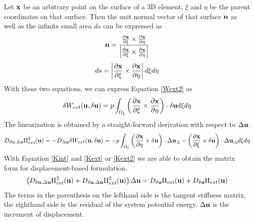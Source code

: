 Let $\bold{x}$ be an arbitrary point on the surface of a 3D element, $\xi$ and $\eta$ be the parent coordinates on that surface. Then the unit normal vector of that surface $\bold{n}$ as well as the infinite small area $ds$ can be expressed as
\begin{equation}
\bold{n} = \frac{  \frac{\partial{\bold{x}}}{\partial{\xi}} \times  \frac{\partial{\bold{x}}}{\partial{\eta}} }{\left| \frac{\partial{\bold{x}}}{\partial{\xi}} \times  \frac{\partial{\bold{x}}}{\partial{\eta}} \right|}
\end{equation}
\begin{equation}
ds = \left|\frac{\partial{\bold{x}}}{\partial{\xi}} \times  \frac{\partial{\bold{x}}}{\partial{\eta}}\right| d\xi{d\eta}
\end{equation}
With these two equations, we can express Equation \ref{Wext2} as
\begin{equation}
\delta{W_{ext}}(\bold{u}, \delta{\bold{u}}) = p\int_{\Omega_{\xi}}  \left(\frac{\partial{\bold{x}}}{\partial{\xi}} \times  \frac{\partial{\bold{x}}}{\partial{\eta}}\right) \cdot\delta{\bold{u}}d\xi{d\eta}
\end{equation}
The linearization is obtained by a straight-forward derivation with respect to $\Delta\bold{u}$. 
\begin{equation}  \label{Kext2}
D_{\delta\bold{u}, \Delta\bold{u}}\Pi_{ext}^2(\bold{u}) = - D_{\Delta{\bold{u}}}\delta{W_{ext}}(\bold{u}, \delta{\bold{u}}) = - p\int_{\Omega_{\xi}}  \left(\frac{\partial{\bold{x}}}{\partial{\eta}} \times \delta\bold{u}\right) \cdot\Delta{\bold{u}}_{,\xi} - 
\left(\frac{\partial{\bold{x}}}{\partial{\xi}} \times \delta\bold{u}\right) \cdot\Delta{\bold{u}}_{,\eta} d\xi{d\eta}
\end{equation}
With Equation \ref{Kint} and \ref{Kext} or \ref{Kext2} we are able to obtain the matrix form for displacement-based formulation.
\begin{equation} \label{matrix}
\left( D_{\delta\bold{u}, \Delta\bold{u}}\Pi_{int}^2(\bold{u}) + D_{\delta\bold{u}, \Delta\bold{u}}\Pi_{ext}^2(\bold{u})  \right) \Delta\bold{u} = D_{\delta\bold{u}}\Pi_{int}(\bold{u}) + D_{\delta\bold{u}}\Pi_{ext}(\bold{u})
\end{equation}
The terms in the parenthesis on the lefthand side is the tangent stiffness matrix, the righthand side is the residual of the system potential energy. $\Delta\bold{u}$ is the increment of displacement. 

